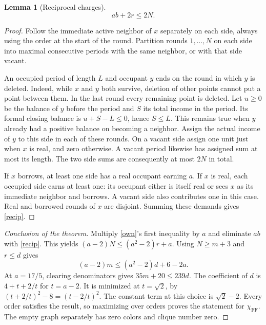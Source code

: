 \documentclass[11pt]{article}
\newtheorem{lemma}[theorem]{Lemma}
\begin{document}
\begin{lemma}[Reciprocal charges]
\begin{equation}
 ab+2r\le 2N. \label{recip}
\end{equation}
\end{lemma}
\begin{proof}
Follow the immediate active neighbor of $x$ separately on each side,
always using the order at the start of the round. Partition rounds
$1,\ldots,N$ on each side into maximal consecutive periods with the same
neighbor, or with that side vacant.

An occupied period of length $L$ and occupant $y$ ends on the round in
which $y$ is deleted. Indeed, while $x$ and $y$ both survive, deletion
of other points cannot put a point between them. In the last round every
remaining point is deleted. Let $u\ge0$ be the balance of $y$ before
the period and $S$ its total income in the period. Its formal closing
balance is $u+S-L\le0$, hence $S\le L$. This remains true when $y$
already had a positive balance on becoming a neighbor. Assign the actual
income of $y$ to this side in each of these rounds. On a vacant side
assign one unit just when $x$ is real, and zero otherwise. A vacant
period likewise has assigned sum at most its length. The two side sums
are consequently at most $2N$ in total.

If $x$ borrows, at least one side has a real occupant earning $a$.
If $x$ is real, each occupied side earns at least one: its occupant
either is itself real or sees $x$ as its immediate neighbor and borrows.
A vacant side also contributes one in this case. Real and borrowed
rounds of $x$ are disjoint. Summing these demands gives \eqref{recip}.
\end{proof}

\begin{proof}[Conclusion of the theorem]
Multiply \eqref{own}'s first inequality by $a$ and eliminate $ab$
with \eqref{recip}. This yields $(a-2)N\le(a^2-2)r+a$.
Using $N\ge m+3$ and $r\le d$ gives
\begin{equation}
(a-2)m\le(a^2-2)d+6-2a. \label{family}
\end{equation}
At $a=17/5$, clearing denominators gives $35m+20\le239d$.
The coefficient of $d$ is $4+t+2/t$ for $t=a-2$. It is minimized
at $t=\sqrt2$, by $(t+2/t)^2-8=(t-2/t)^2$. The constant term at
this choice is $\sqrt2-2$. Every order satisfies the result, so
maximizing over orders proves the statement for $\chi_{\mathrm{FF}}$.
The empty graph separately has zero colors and clique number zero.
\end{proof}
\end{document}
